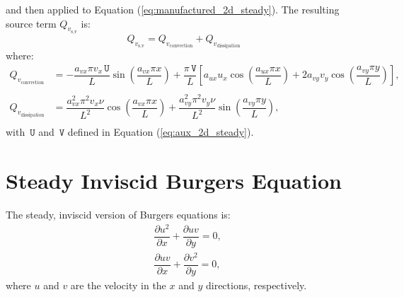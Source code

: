 \documentclass[10pt]{article}
\newcommand{\diff}[2] {\dfrac{\partial #1}{\partial #2}}
\newcommand{\U}{\,\mathtt{U}}
\newcommand{\V}{\,\mathtt{V}}
\begin{document}
and then applied to Equation  (\ref{eq:manufactured_2d_steady}).  The resulting source term $Q_{v_\text{s,v}}$ is:
$$Q_{v_\text{s,v}}= Q_{v_\text{convection}}+Q_{v_\text{dissipation}}$$
where:
\begin{equation}
\begin{split}
%
 Q_{v_\text{convection}} &= -\dfrac{a_{vx} \pi v_x \U}{L} \sin\left(\dfrac{a_{vx} \pi x}{L}\right)+\dfrac{ \pi \V}{L}\left[a_{ux} u_x \cos\left(\dfrac{a_{ux} \pi x}{L}\right)+2 a_{vy} v_y \cos\left(\dfrac{a_{vy} \pi y}{L}\right)\right] , \\  
%
&\\
%
 Q_{v_\text{dissipation}} &= \dfrac{a_{vx}^2 \pi^2 v_x \nu }{L^2}\cos\left(\dfrac{a_{vx} \pi x}{L}\right)+\dfrac{a_{vy}^2 \pi^2 v_y \nu }{L^2}\sin\left(\dfrac{a_{vy} \pi y}{L}\right), \\  
\end{split}
\end{equation}
with $\U$ and $\V$ defined in Equation (\ref{eq:aux_2d_steady}).




\section{Steady Inviscid Burgers Equation}


The steady, inviscid version of Burgers equations is:
\begin{equation}
 \label{eq:burgers2d_sinv}
\begin{split}
& \diff{ u^2 }{x}+\diff{uv}{y}=0,\\
& \diff{ u v}{x} + \diff{  v^2 }{y}=0,
\end{split}
\end{equation}
%
where $u$ and $v$ are the velocity in the  $x$ and $y$  directions, respectively.
\end{document}
